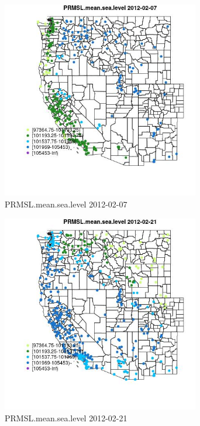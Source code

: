 \begin{figure} 
\centering  
\includegraphics[width=0.77\textwidth]{Code_Outputs/Report_ML_input_PM25_Step4_part_f_de_duplicated_aveswNAs_MapObsPRMSLmeansealevel2012-02-07.jpg} 
\caption{\label{fig:Report_ML_input_PM25_Step4_part_f_de_duplicated_aveswNAsMapObsPRMSLmeansealevel2012-02-07}PRMSL.mean.sea.level 2012-02-07} 
\end{figure} 
 

\begin{figure} 
\centering  
\includegraphics[width=0.77\textwidth]{Code_Outputs/Report_ML_input_PM25_Step4_part_f_de_duplicated_aveswNAs_MapObsPRMSLmeansealevel2012-02-21.jpg} 
\caption{\label{fig:Report_ML_input_PM25_Step4_part_f_de_duplicated_aveswNAsMapObsPRMSLmeansealevel2012-02-21}PRMSL.mean.sea.level 2012-02-21} 
\end{figure} 
 

